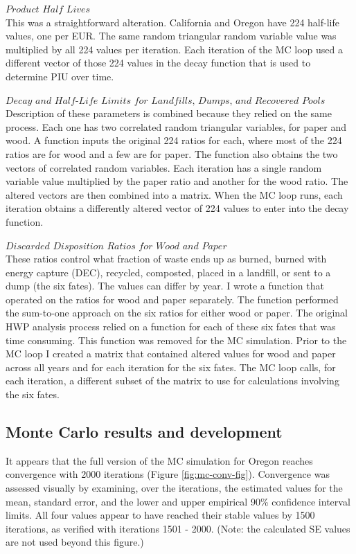 \documentclass[
  openany]{book}
\begin{document}
\(\textit{Product Half Lives}\)\\
This was a straightforward alteration. California and Oregon have 224 half-life values, one per EUR. The same random triangular random variable value was multiplied by all 224 values per iteration. Each iteration of the MC loop used a different vector of those 224 values in the decay function that is used to determine PIU over time.

\(\textit{Decay and Half-Life Limits for Landfills, Dumps, and Recovered Pools}\)\\
Description of these parameters is combined because they relied on the same process. Each one has two correlated random triangular variables, for paper and wood. A function inputs the original 224 ratios for each, where most of the 224 ratios are for wood and a few are for paper. The function also obtains the two vectors of correlated random variables. Each iteration has a single random variable value multiplied by the paper ratio and another for the wood ratio. The altered vectors are then combined into a matrix. When the MC loop runs, each iteration obtains a differently altered vector of 224 values to enter into the decay function.

\(\textit{Discarded Disposition Ratios for Wood and Paper}\)\\
These ratios control what fraction of waste ends up as burned, burned with energy capture (DEC), recycled, composted, placed in a landfill, or sent to a dump (the six fates). The values can differ by year. I wrote a function that operated on the ratios for wood and paper separately. The function performed the sum-to-one approach on the six ratios for either wood or paper. The original HWP analysis process relied on a function for each of these six fates that was time consuming. This function was removed for the MC simulation. Prior to the MC loop I created a matrix that contained altered values for wood and paper across all years and for each iteration for the six fates. The MC loop calls, for each iteration, a different subset of the matrix to use for calculations involving the six fates.

\hypertarget{model-mc-res}{%
\subsection{Monte Carlo results and development}\label{model-mc-res}}

It appears that the full version of the MC simulation for Oregon reaches convergence with 2000 iterations (Figure \ref{fig:mc-conv-fig}). Convergence was assessed visually by examining, over the iterations, the estimated values for the mean, standard error, and the lower and upper empirical 90\% confidence interval limits. All four values appear to have reached their stable values by 1500 iterations, as verified with iterations 1501 - 2000. (Note: the calculated SE values are not used beyond this figure.)
\end{document}
